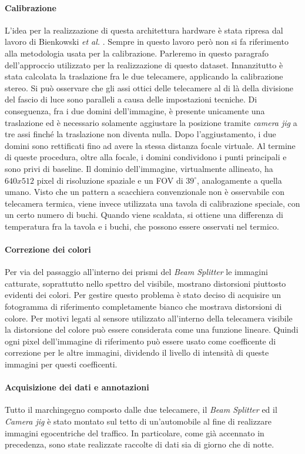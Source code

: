 \paragraph{Calibrazione} L'idea per la realizzazione di questa architettura hardware è stata ripresa dal lavoro di Bienkowski \textit{et al.} \cite{bienkowski2012}. Sempre in questo lavoro però non si fa riferimento alla metodologia usata per la calibrazione. Parleremo in questo paragrafo dell'approccio utilizzato per la realizzazione di questo dataset. Innanzitutto è stata calcolata la traslazione fra le due telecamere, applicando la calibrazione stereo. Si può osservare che gli assi ottici delle telecamere al di là della divisione del fascio di luce sono paralleli a causa delle impostazioni tecniche. Di conseguenza, fra i due domini dell’immagine, è presente unicamente una traslazione ed è necessario solamente aggiustare la posizione tramite \textit{camera jig} a tre assi finché la traslazione non diventa nulla. Dopo l’aggiustamento, i due domini sono rettificati fino ad avere la stessa distanza focale virtuale. Al termine di queste procedura, oltre alla focale, i domini condividono i punti principali e sono privi di baseline.
Il dominio dell’immagine, virtualmente allineato, ha $640 x 512$ pixel di risoluzione spaziale e un \ac{FOV} di $39^\circ$, analogamente a quella umano. Visto che un pattern a scacchiera convenzionale non è osservabile con telecamera termica, viene invece utilizzata una tavola di calibrazione speciale, con un certo numero di buchi. Quando viene scaldata, si ottiene una differenza di temperatura fra la tavola e i buchi, che possono essere osservati nel termico.
\paragraph{Correzione dei colori}
Per via del passaggio all'interno dei prismi del \textit{Beam Splitter} le immagini catturate, soprattutto nello spettro del visibile, mostrano distorsioni piuttosto evidenti dei colori. Per gestire questo problema è stato deciso di acquisire un fotogramma di riferimento completamente bianco che mostrava distorsioni di colore. Per motivi legati al sensore utilizzato all'interno della telecamera visibile la distorsione del colore può essere considerata come una funzione lineare. Quindi ogni pixel dell'immagine di riferimento può essere usato come coefficente di correzione per le altre immagini, dividendo il livello di intensità di queste immagini per questi coefficenti.
\paragraph{Acquisizione dei dati e annotazioni}
Tutto il marchingegno composto dalle due telecamere, il \textit{Beam Splitter} ed il \textit{Camera jig} è stato montato sul tetto di un'automobile al fine di realizzare immagini egocentriche del traffico. In particolare, come già accennato in precedenza, sono state realizzate raccolte di dati sia di giorno che di notte.

